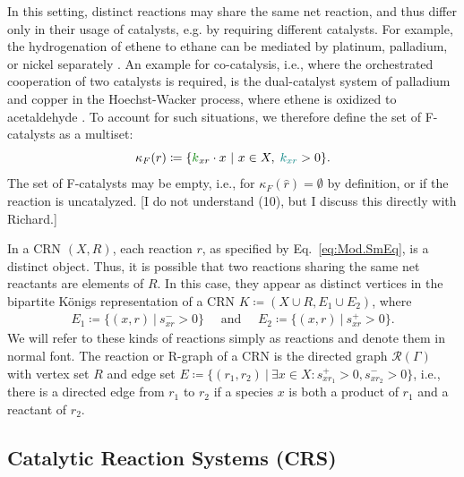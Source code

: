 \documentclass[pdflatex]{sn-jnl}
\theoremstyle{thmstyleone}%
\theoremstyle{examplesty}%
\theoremstyle{thmstylethree}%
\newcommand{\king}{K}
\newcommand{\CR}[0]{R}
\newcommand{\C}[1]{\mathit{#1}}
\newcommand{\net}[1]{\hat{#1}}
\newcommand{\cat}{\kappa_F}
\newcommand{\PFS}[1]{\begingroup\color{cyan}#1\endgroup}
\newcommand{\TG}[1]{\begingroup\color{middlegreen}#1\endgroup}
\newcommand{\NV}[1]{\begingroup\color{teal}#1\endgroup}
\newcommand{\Wim}[1]{\begingroup\color{purple}#1\endgroup}
\begin{document}
\NV{In this setting, distinct reactions may share the same net reaction, and thus differ only in} their usage of
catalysts, \NV{e.g.} by requiring different 
catalysts. For example, the hydrogenation of ethene to ethane can be
mediated by platinum, palladium, or nickel separately
\cite{crampton_ethylene_2016}. An example for co-catalysis, i.e., where the
orchestrated cooperation of two catalysts is required, is the dual-catalyst
system of palladium and copper in the Hoechst-Wacker process, where ethene
is oxidized to acetaldehyde \cite{jira_acetaldehyde_2009}. \PFS{To account
  for such situations, we} therefore define the set of F-catalysts as a
multiset:
\begin{equation}
  \cat(r)\coloneqq \{\TG{k}_{xr} \cdot x\ | \ x\in X,\; \NV{k_{xr}}>0\}.
\end{equation}
The set of F-catalysts may be empty, i.e., for $\cat({\net{r}})=\emptyset$
by definition, or if the reaction is uncatalyzed. \NV{[I do not understand (10), but I discuss this directly with Richard.]}

In a CRN $(X,\CR)$, each reaction $r$, as specified by
Eq.~\ref{eq:Mod.SmEq}, is a distinct object. Thus, it is possible that two
reactions sharing the same net reactants are elements of $\CR$. In this
case, they appear as \NV{distinct} vertices in the bipartite K\"onigs
representation of a CRN $\king\coloneqq (X\cup \C{R}, E_1\cup E_2)$, where
\begin{equation}
  \begin{split}
    E_1\coloneqq \{(x,r) \ | \ s^-_{xr}>0\} \quad \text{ and } \quad E_2\coloneqq \{(x,r) \ | \ s^+_{xr}>0 \}. 
  \end{split}
\end{equation}
We will refer to these kinds of reactions simply as reactions and denote
them in normal font. The reaction or R-graph of a CRN is the directed graph
$\mathcal{R}(\Gamma)$ with vertex set $R$ and edge set $E\coloneqq
\{(r_1,r_2) \ \vert \ \exists x\in X: s^+_{xr_1}>0,s^-_{xr_2}>0\}$, \Wim{i.e., 
there is a directed edge from $r_1$ to $r_2$ if a species $x$ is both a 
product of $r_1$ and a reactant of $r_2$.}

\subsection{Catalytic Reaction Systems (CRS)}
\end{document}
